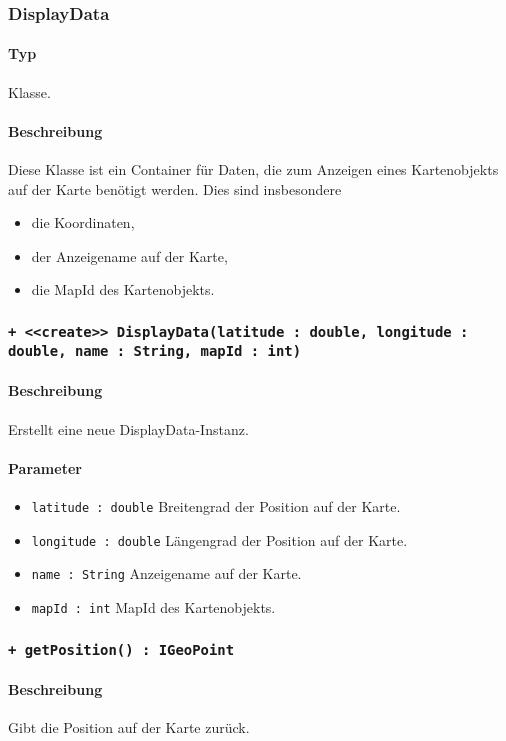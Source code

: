 \subsubsection{DisplayData}\label{App_Map_Util_DisplayData}
\paragraph*{Typ}
Klasse.
\paragraph*{Beschreibung}
Diese Klasse ist ein Container für Daten, die zum Anzeigen eines Kartenobjekts auf der 
Karte benötigt werden. Dies sind insbesondere
\begin{itemize}
    \item die Koordinaten,
    \item der Anzeigename auf der Karte,
    \item die MapId des Kartenobjekts.
\end{itemize}

\subsubsection*{\texttt{+ <<create>> DisplayData(latitude : double, longitude : double, name : String, mapId : int)}}%
\paragraph*{Beschreibung}
Erstellt eine neue DisplayData-Instanz.
\paragraph*{Parameter}
\begin{itemize}
    \item \texttt{latitude : double} Breitengrad der Position auf der Karte.
    \item \texttt{longitude : double} Längengrad der Position auf der Karte.
    \item \texttt{name : String} Anzeigename auf der Karte.
    \item \texttt{mapId : int} MapId des Kartenobjekts.
\end{itemize}

\subsubsection*{\texttt{+ getPosition() : IGeoPoint}}%
\paragraph*{Beschreibung}
Gibt die Position auf der Karte zurück.
